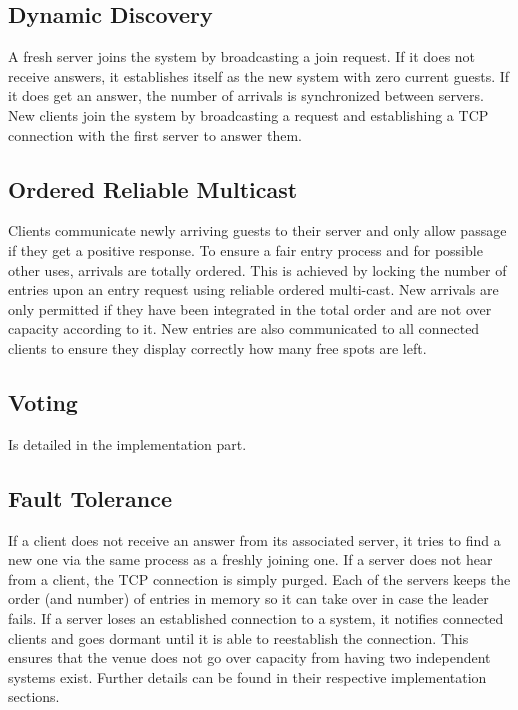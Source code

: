 \documentclass[runningheads]{llncs}
\begin{document}
\subsection{Dynamic Discovery} \label{dyndisc}
A fresh server joins the system by broadcasting a join request.
If it does not receive answers, it establishes itself as the new system with zero current guests.
If it does get an answer, the number of arrivals is synchronized between servers.
New clients join the system by broadcasting a request and establishing a TCP connection with the first server to answer them.

\subsection{Ordered Reliable Multicast}
Clients communicate newly arriving guests to their server and only allow passage if they get a positive response.
To ensure a fair entry process and for possible other uses, arrivals are totally ordered.
This is achieved by locking the number of entries upon an entry request using reliable ordered multi-cast.
New arrivals are only permitted if they have been integrated in the total order and are not over capacity according to it.
New entries are also communicated to all connected clients to ensure they display correctly how many free spots are left.

\subsection{Voting}
Is detailed in the implementation part.

\subsection{Fault Tolerance}
If a client does not receive an answer from its associated server, it tries to find a new one via the same process as a freshly joining one.
If a server does not hear from a client, the TCP connection is simply purged.
Each of the servers keeps the order (and number) of entries in memory so it can take over in case the leader fails.
If a server loses an established connection to a system, it notifies connected clients and goes dormant until it is able to reestablish the connection.
This ensures that the venue does not go over capacity from having two independent systems exist.
Further details can be found in their respective implementation sections.
\end{document}
